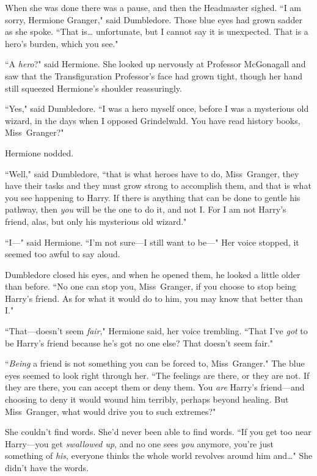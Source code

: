 When she was done there was a pause, and then the Headmaster sighed. ``I am sorry, Hermione Granger," said Dumbledore. Those blue eyes had grown sadder as she spoke. ``That is{\ldots} unfortunate, but I cannot say it is unexpected. That is a hero's burden, which you see."

``A \emph{hero}?" said Hermione. She looked up nervously at Professor McGonagall and saw that the Transfiguration Professor's face had grown tight, though her hand still squeezed Hermione's shoulder reassuringly.

``Yes," said Dumbledore. ``I was a hero myself once, before I was a mysterious old wizard, in the days when I opposed Grindelwald. You have read history books, Miss~Granger?"

Hermione nodded.

``Well," said Dumbledore, ``that is what heroes have to do, Miss~Granger, they have their tasks and they must grow strong to accomplish them, and that is what you see happening to Harry. If there is anything that can be done to gentle his pathway, then \emph{you} will be the one to do it, and not I\@. For I am not Harry's friend, alas, but only his mysterious old wizard."

``I—" said Hermione. ``I'm not sure—I still want to be—" Her voice stopped, it seemed too awful to say aloud.

Dumbledore closed his eyes, and when he opened them, he looked a little older than before. ``No one can stop you, Miss~Granger, if you choose to stop being Harry's friend. As for what it would do to him, you may know that better than I."

``That—doesn't seem \emph{fair}," Hermione said, her voice trembling. ``That I've \emph{got} to be Harry's friend because he's got no one else? That doesn't seem fair."

``\emph{Being} a friend is not something you can be forced to, Miss~Granger." The blue eyes seemed to look right through her. ``The feelings are there, or they are not. If they are there, you can accept them or deny them. You \emph{are} Harry's friend—and choosing to deny it would wound him terribly, perhaps beyond healing. But Miss~Granger, what would drive you to such extremes?"

She couldn't find words. She'd never been able to find words. ``If you get too near Harry—you get \emph{swallowed up}, and no one sees \emph{you} anymore, you're just something of \emph{his}, everyone thinks the whole world revolves around him and{\ldots}" She didn't have the words.

